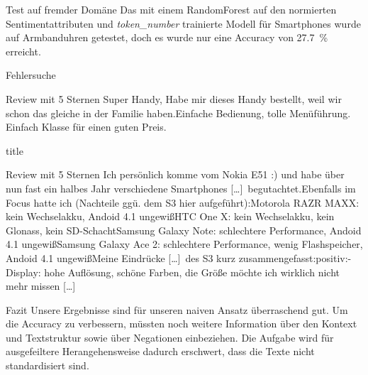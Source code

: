 \documentclass[note=hide]{beamer} %
\newcommand{\feature}[1]{\emph{#1}}
\newcommand{\ellipse}{[\ldots]}
\begin{document}
\begin{frame}{Test auf fremder Domäne}
	Das mit einem RandomForest auf den normierten Sentimentattributen und \feature{token\_number} trainierte Modell für Smartphones wurde auf Armbanduhren getestet, doch es wurde nur eine Accuracy von \SI{27.7}{\%} erreicht.
\end{frame}

\begin{frame}{Fehlersuche}
	\begin{block}{Review mit 5 Sternen}
		Super Handy, Habe mir dieses Handy bestellt, weil wir schon das gleiche in der Familie haben.Einfache Bedienung, tolle Menüführung. Einfach Klasse für einen guten Preis.
	\end{block}
\end{frame}

\begin{frame}{title}
	\begin{block}{Review mit 5 Sternen}
	Ich persönlich komme vom Nokia E51 :) und habe über nun fast ein halbes Jahr verschiedene Smartphones \ellipse\ begutachtet.Ebenfalls im Focus hatte ich (Nachteile ggü. dem S3 hier aufgeführt):Motorola RAZR MAXX: kein Wechselakku, Andoid 4.1 ungewißHTC One X: kein Wechselakku, kein Glonass, kein SD-SchachtSamsung Galaxy Note: schlechtere Performance, Andoid 4.1 ungewißSamsung Galaxy Ace 2: schlechtere Performance, wenig Flashspeicher, Andoid 4.1 ungewißMeine Eindrücke \ellipse\ des S3 kurz zusammengefasst:positiv:- Display: hohe Auflösung, schöne Farben, die Größe möchte ich wirklich nicht mehr missen \ellipse
	\end{block}
\end{frame}

\begin{frame}{Fazit}
	Unsere Ergebnisse sind für unseren naiven Ansatz überraschend gut.
	Um die Accuracy zu verbessern, müssten noch weitere Information über den Kontext und Textstruktur sowie über Negationen einbeziehen.
	Die Aufgabe wird für ausgefeiltere Herangehensweise dadurch erschwert, dass die Texte nicht standardisiert sind.
\end{frame}
\end{document}

